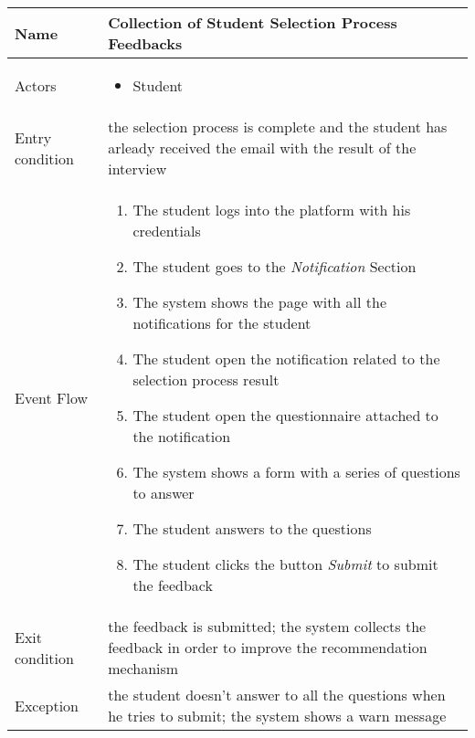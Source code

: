 \begin{table} [H]
					\begin{tabular}{|| P{7.5cm} | P{7.5cm} ||}
						\hline
						Name & Collection of Student Selection Process Feedbacks \\
						\hline
						Actors & \parbox{5cm}{\begin{itemize}
								\item Student
							\end{itemize}
						} \\
						\hline
						Entry condition & the selection process is complete and the student has arleady received the email with the result of the interview \\
						\hline
						Event Flow & \parbox{5cm}{\begin{enumerate}[label=\alpha]
								\item The student logs into the platform with his credentials
								\item The student goes to the \textit{Notification} Section
								\item The system shows the page with all the notifications for the student
								\item The student open the notification related to the selection process result 
								\item The student open the questionnaire attached to the notification
								\item The system shows a form with a series of questions to answer
								\item The student answers to the questions 
								\item The student clicks the button \textit{Submit} to submit the feedback
						\end{enumerate}} \\
						\hline 
						Exit condition & the feedback is submitted; the system collects the feedback in order to improve the recommendation 
						mechanism \\
						\hline
						Exception & the student doesn't answer to all the questions when he tries to submit; the system shows a warn message \\
						\hline
					\end{tabular}
				\end{table}
				
